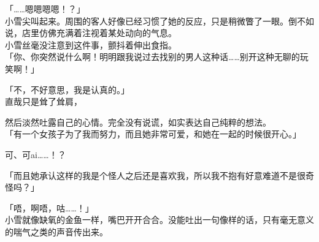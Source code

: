 「……嗯嗯嗯嗯！？」\\

小雪尖叫起来。周围的客人好像已经习惯了她的反应，只是稍微瞥了一眼。倒不如说，店里仿佛充满着注视着某处动向的气息。\\

小雪丝毫没注意到这件事，颤抖着伸出食指。\\

「你、你突然说什么啊！明明跟我说过去找别的男人这种话……别开这种无聊的玩笑啊！」

「不，不好意思，我是认真的。」\\

直哉只是耸了耸肩，

然后淡然吐露自己的心情。完全没有说谎，如实表达自己纯粹的想法。\\

「有一个女孩子为了我而努力，而且她非常可爱，和她在一起的时候很开心。」

可、可ai……！？

「而且她承认这样的我是个怪人之后还是喜欢我，所以我不抱有好意难道不是很奇怪吗？」

「唔，啊唔，咕……！」\\

小雪就像缺氧的金鱼一样，嘴巴开开合合。没能吐出一句像样的话，只有毫无意义的喘气之类的声音传出来。\\


